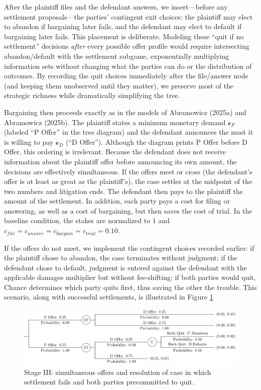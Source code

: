 \documentclass{article}
\begin{document}
After the plaintiff files and the defendant answers, we insert—before any settlement proposals—the parties’ contingent exit choices: the plaintiff may elect to abandon if bargaining later fails, and the defendant may elect to default if bargaining later fails. This placement is deliberate. Modeling these “quit if no settlement” decisions \emph{after} every possible offer profile would require intersecting abandon/default with the settlement subgame, exponentially multiplying information sets without changing what the parties can do or the distribution of outcomes. By recording the quit choices immediately after the file/answer node (and keeping them unobserved until they matter), we preserve most of the strategic richness while dramatically simplifying the tree.

Bargaining then proceeds exactly as in the models of Abramowicz (2025a) and Abramowicz (2025b). The plaintiff states a minimum monetary demand $\mathcal{o}_P$ (labeled “P Offer” in the tree diagram) and the defendant announces the most it is willing to pay $\mathcal{o}_D$ (“D Offer”). Although the diagram prints P Offer before D Offer, this ordering is irrelevant. Because the defendant does not receive information about the plaintiff offer before announcing its own amount, the decisions are effectively simultaneous. If the offers meet or cross (the defendant's offer is at least as great as the plaintiff's), the case settles at the midpoint of the two numbers and litigation ends. The defendant then pays to the plaintiff the amount of the settlement. In addition, each party pays a cost for filing or answering, as well as a cost of bargaining, but then saves the cost of trial. In the baseline condition, the stakes are normalized to $1$ and $c_{file} = c_{answer} = c_{bargain} = c_{trial} = 0.10$.

If the offers do not meet, we implement the contingent choices recorded earlier: if the plaintiff chose to abandon, the case terminates without judgment; if the defendant chose to default, judgment is entered against the defendant with the applicable damages multiplier but without fee-shifting; if both parties would quit, Chance determines which party quits first, thus saving the other the trouble. This scenario, along with successful settlements, is illustrated in Figure \ref{fig:smalltree_end}

  \begin{figure}[t]
    \centering
    \includegraphics[width=\textwidth]{../Figures/smalltree_end.pdf}
    \caption{Stage III: simultaneous offers and resolution of case in which settlement fails and both parties precommitted to quit.}
    \label{fig:smalltree_end}
  \end{figure}
\end{document}
